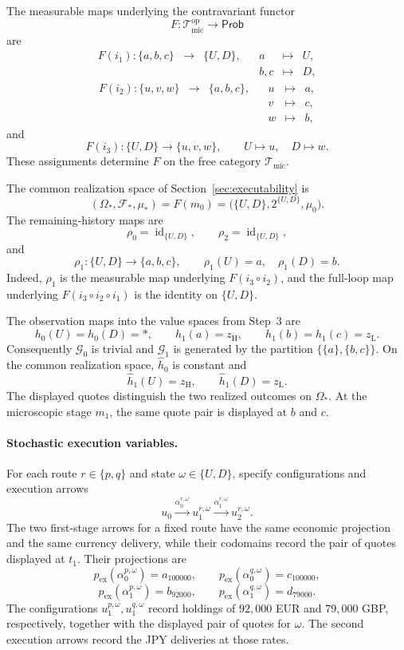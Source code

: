 \documentclass[11pt,a4paper]{article}
\newcommand{\Prob}{\mathsf{Prob}}
\newcommand{\id}{\operatorname{id}}
\newcommand{\Tmic}{\mathcal T_{\mathrm{mic}}}
\begin{document}
The measurable maps underlying the contravariant functor
\[
  F:\Tmic^{\mathrm{op}}\longrightarrow\Prob
\]
are
\[
\begin{array}{rclcrcl}
F(i_1):\{a,b,c\}&\longrightarrow&\{U,D\},
&&a&\longmapsto&U,\\
&&&&b,c&\longmapsto&D,
\end{array}
\]
\[
\begin{array}{rclcrcl}
F(i_2):\{u,v,w\}&\longrightarrow&\{a,b,c\},
&&u&\longmapsto&a,\\
&&&&v&\longmapsto&c,\\
&&&&w&\longmapsto&b,
\end{array}
\]
and
\[
  F(i_3):\{U,D\}\longrightarrow\{u,v,w\},
  \qquad
  U\longmapsto u,
  \quad
  D\longmapsto w.
\]
These assignments determine $F$ on the free category $\Tmic$.

The common realization space of Section~\ref{sec:executability} is
\[
  (\Omega_*,\mathcal F_*,\mu_*)
  =F(m_0)
  =\bigl(\{U,D\},2^{\{U,D\}},\mu_0\bigr).
\]
The remaining-history maps are
\[
  \rho_0=\id_{\{U,D\}},
  \qquad
  \rho_2=\id_{\{U,D\}},
\]
and
\[
  \rho_1:\{U,D\}\longrightarrow\{a,b,c\},
  \qquad
  \rho_1(U)=a,
  \quad
  \rho_1(D)=b.
  \tag{O1}
\]
Indeed, $\rho_1$ is the measurable map underlying
$F(i_3\circ i_2)$, and the full-loop map underlying
$F(i_3\circ i_2\circ i_1)$ is the identity on $\{U,D\}$.

The observation maps into the value spaces from Step~3 are
\[
  h_0(U)=h_0(D)=*,\qquad
  h_1(a)=z_{\mathrm H},\qquad h_1(b)=h_1(c)=z_{\mathrm L}.
\]
Consequently $\mathcal G_0$ is trivial and $\mathcal G_1$ is generated by
the partition $\{\{a\},\{b,c\}\}$. On the common realization space,
$\widehat h_0$ is constant and
\[
  \widehat h_1(U)=z_{\mathrm H},
  \qquad \widehat h_1(D)=z_{\mathrm L}.
\]
The displayed quotes distinguish the two realized outcomes on $\Omega_*$.
At the microscopic stage $m_1$, the same quote pair is displayed at $b$
and $c$.

\paragraph{Stochastic execution variables.}
For each route $r\in\{p,q\}$ and state $\omega\in\{U,D\}$, specify
configurations and execution arrows
\[
  u_0\xrightarrow{\alpha_0^{r,\omega}}u_1^{r,\omega}
       \xrightarrow{\alpha_1^{r,\omega}}u_2^{r,\omega}.
\]
The two first-stage arrows for a fixed route have the same economic
projection and the same currency delivery, while their codomains record the
pair of quotes displayed at $t_1$.
Their projections are
\[
  p_{\mathrm{ex}}(\alpha_0^{p,\omega})=a_{100000},
  \qquad
  p_{\mathrm{ex}}(\alpha_0^{q,\omega})=c_{100000},
\]
\[
  p_{\mathrm{ex}}(\alpha_1^{p,\omega})=b_{92000},
  \qquad
  p_{\mathrm{ex}}(\alpha_1^{q,\omega})=d_{79000}.
\]
The configurations $u_1^{p,\omega},u_1^{q,\omega}$ record holdings of
$92{,}000$ EUR and $79{,}000$ GBP, respectively, together with the displayed
pair of quotes for $\omega$.
The second execution arrows record the JPY deliveries at those rates.
\end{document}
